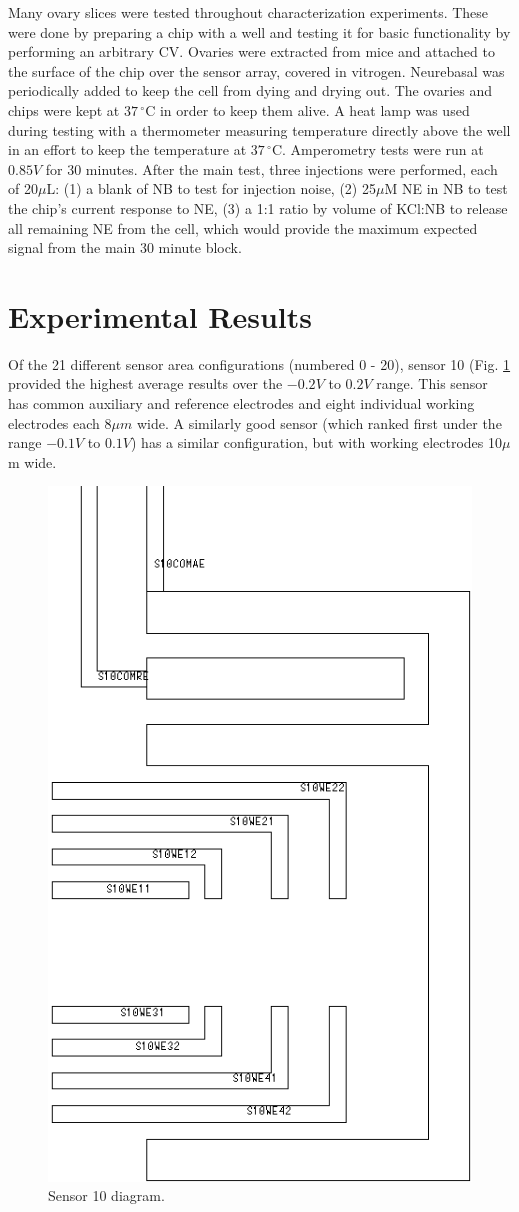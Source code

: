 \documentclass[twocolumn]{article}
\begin{document}
Many ovary slices were tested throughout characterization experiments. These were done by preparing a chip with a well and testing it for basic functionality by performing an arbitrary CV. Ovaries were extracted from mice and attached to the surface of the chip over the sensor array, covered in vitrogen. Neurebasal was periodically added to keep the cell from dying and drying out. The ovaries and chips were kept at $37\,^{\circ}\mathrm{C}$ in order to keep them alive. A heat lamp was used during testing with a thermometer measuring temperature directly above the well in an effort to keep the temperature at $37\,^{\circ}\mathrm{C}$. Amperometry tests were run at $0.85V$ for 30 minutes. After the main test, three injections were performed, each of 20$\mu$L: (1) a blank of NB to test for injection noise, (2) 25$\mu$M NE in NB to test the chip's current response to NE, (3) a 1:1 ratio by volume of KCl:NB to release all remaining NE from the cell, which would provide the maximum expected signal from the main 30 minute block.

\section{Experimental Results}

Of the 21 different sensor area configurations (numbered 0 - 20), sensor 10 (Fig. \ref{sensor-10} provided the highest average results over the $-0.2V$ to $0.2V$ range. This sensor has common auxiliary and reference electrodes and eight individual working electrodes each $8\mu m$ wide. A similarly good sensor (which ranked first under the range $-0.1V$ to $0.1V$) has a similar configuration, but with working electrodes 10$\mu$m wide.

\begin{figure}
\centering
\includegraphics[height=\linewidth]{figures/s10.png}
\caption{Sensor 10 diagram.}
\label{sensor-10}
\end{figure}
\end{document}
